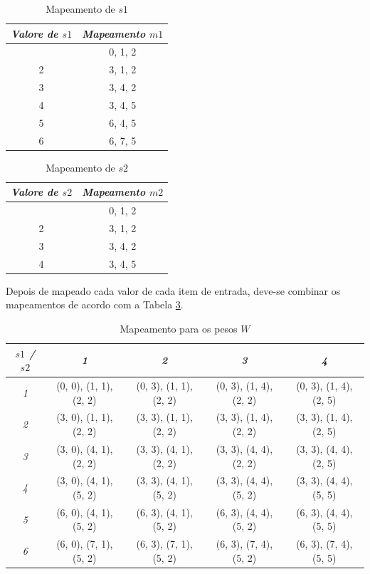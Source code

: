 \begin{table}[H]
	\centering
	\caption{Mapeamento de $s1$}
	\label{disc_s1}
	\ABNTEXfontereduzida
	\begin{tabular}{c c}
		\toprule
		\textit{Valore de $s1$} & \textit{Mapeamento $m1$}\\
		\midrule
		\ABNTEXfontereduzida
		1 & 0, 1, 2 \\
		2 & 3, 1, 2 \\
		3 & 3, 4, 2 \\
		4 & 3, 4, 5 \\
		5 & 6, 4, 5 \\
		6 & 6, 7, 5 \\
		\bottomrule
	\end{tabular}
\end{table}
\begin{table}[H]
	\centering
	\caption{Mapeamento de $s2$}
	\label{disc_s2}
	\ABNTEXfontereduzida
	\begin{tabular}{c c}
		\toprule
		\textit{Valore de $s2$} & \textit{Mapeamento $m2$}\\
		\midrule
		\ABNTEXfontereduzida
		1 & 0, 1, 2 \\
		2 & 3, 1, 2 \\
		3 & 3, 4, 2 \\
		4 & 3, 4, 5 \\
		\bottomrule
	\end{tabular}
\end{table}


Depois de mapeado cada valor de cada item de entrada, deve-se combinar os mapeamentos de acordo com a Tabela \ref{wmap}.

\begin{table}[ht]
	\centering
	\caption{Mapeamento para os pesos $W$}
	\label{wmap}
	\ABNTEXfontereduzida
	\begin{tabular}{c c c c c}
		\toprule
		\textit{$s1$ / $s2$} & \textit{1}  & \textit{2} & \textit{3} & \textit{4} \\
		\midrule
		\ABNTEXfontereduzida

		\textit{1} & (0, 0), (1, 1), (2, 2) & (0, 3), (1, 1), (2, 2) & (0, 3), (1, 4), (2, 2) & (0, 3), (1, 4), (2, 5) \\
		\textit{2} & (3, 0), (1, 1), (2, 2) & (3, 3), (1, 1), (2, 2) & (3, 3), (1, 4), (2, 2) & (3, 3), (1, 4), (2, 5) \\
		\textit{3} & (3, 0), (4, 1), (2, 2) & (3, 3), (4, 1), (2, 2) & (3, 3), (4, 4), (2, 2) & (3, 3), (4, 4), (2, 5) \\
		\textit{4} & (3, 0), (4, 1), (5, 2) & (3, 3), (4, 1), (5, 2) & (3, 3), (4, 4), (5, 2) & (3, 3), (4, 4), (5, 5) \\
		\textit{5} & (6, 0), (4, 1), (5, 2) & (6, 3), (4, 1), (5, 2) & (6, 3), (4, 4), (5, 2) & (6, 3), (4, 4), (5, 5) \\
		\textit{6} & (6, 0), (7, 1), (5, 2) & (6, 3), (7, 1), (5, 2) & (6, 3), (7, 4), (5, 2) & (6, 3), (7, 4), (5, 5) \\

		\bottomrule
	\end{tabular}
\end{table}
 


